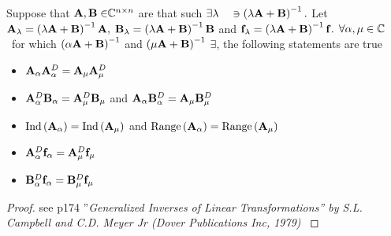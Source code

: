 \begin{theorem}
Suppose that ${\bf A,B\in }{\Bbb C}^{n\times n}$ are that such $\exists
\lambda \quad \ni \left( \lambda {\bf A+B}\right) ^{-1}.$ Let ${\bf A}%
_{\lambda }=\left( \lambda {\bf A+B}\right) ^{-1}{\bf A,}$ ${\bf B}_{\lambda
}=\left( \lambda {\bf A+B}\right) ^{-1}{\bf B}$ and ${\bf f}_{\lambda
}=\left( \lambda {\bf A+B}\right) ^{-1}{\bf f.}$ $\forall \alpha ,\mu \in 
{\Bbb C}$ \ for which $\left( \alpha {\bf A+B}\right) ^{-1}$ and $\left( \mu 
{\bf A+B}\right) ^{-1}$ $\exists $, the following statements are true

\begin{itemize}
\item ${\bf A}_{\alpha }{\bf A}_{\alpha }^{D}={\bf A}_{\mu }{\bf A}_{\mu
}^{D}$

\item ${\bf A}_{\alpha }^{D}{\bf B}_{\alpha }={\bf A}_{\mu }^{D}{\bf B}_{\mu
}$ and ${\bf A}_{\alpha }{\bf B}_{\alpha }^{D}={\bf A}_{\mu }{\bf B}_{\mu
}^{D}$

\item $%
\mathop{\rm Ind}%
\left( {\bf A}_{\alpha }\right) =%
\mathop{\rm Ind}%
\left( {\bf A}_{\mu }\right) $ and $%
\mathop{\rm Range}%
\left( {\bf A}_{\alpha }\right) =%
\mathop{\rm Range}%
\left( {\bf A}_{\mu }\right) $

\item ${\bf A}_{\alpha }^{D}{\bf f}_{\alpha }={\bf A}_{\mu }^{D}{\bf f}_{\mu
}$

\item ${\bf B}_{\alpha }^{D}{\bf f}_{\alpha }={\bf B}_{\mu }^{D}{\bf f}_{\mu
}$
\end{itemize}
\end{theorem}

\begin{proof}
see p174 ''{\it Generalized Inverses of Linear Transformations'' by S.L.
Campbell and C.D. Meyer Jr (Dover Publications Inc, 1979) }
\end{proof}

